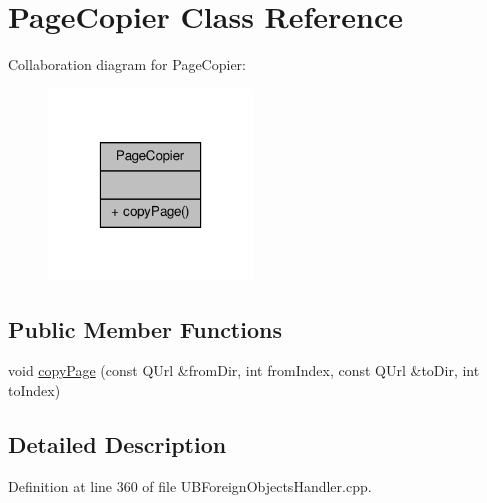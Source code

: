 \hypertarget{class_page_copier}{\section{Page\-Copier Class Reference}
\label{d8/d29/class_page_copier}
}


Collaboration diagram for Page\-Copier\-:
\nopagebreak
\begin{figure}[H]
\begin{center}
\leavevmode
\includegraphics[width=154pt]{da/d06/class_page_copier__coll__graph}
\end{center}
\end{figure}
\subsection*{Public Member Functions}
\begin{DoxyCompactItemize}
\item 
void \hyperlink{class_page_copier_acb8e021b589aaaf65c8789cfb9c7eeb5}{copy\-Page} (const Q\-Url \&from\-Dir, int from\-Index, const Q\-Url \&to\-Dir, int to\-Index)
\end{DoxyCompactItemize}


\subsection{Detailed Description}


Definition at line 360 of file U\-B\-Foreign\-Objects\-Handler.\-cpp.



